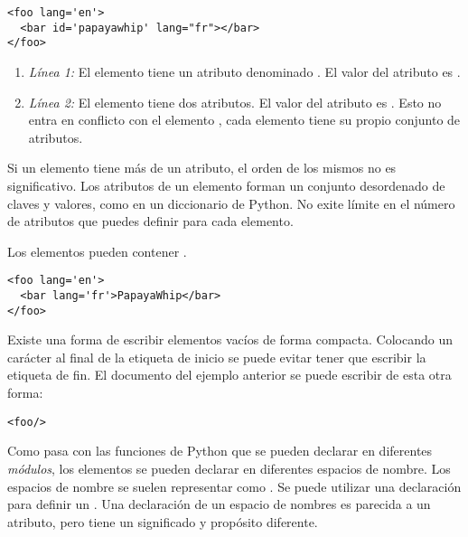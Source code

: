 \noindent\begin{minipage}{\textwidth}
\begin{lstlisting}[mathescape=True]
<foo lang='en'>
  <bar id='papayawhip' lang="fr"></bar>
</foo>
\end{lstlisting}
\end{minipage}

\begin{enumerate}

\item \emph{Línea 1:} El elemento  tiene un atributo denominado . El valor del atributo  es .

\item \emph{Línea 2:} El elemento  tiene dos atributos. El valor del atributo  es . Esto no entra en conflicto con el elemento , cada elemento tiene su propio conjunto de atributos.

\end{enumerate}

Si un elemento tiene más de un atributo, el orden de los mismos no es significativo. Los atributos de un elemento forman un conjunto desordenado de claves y valores, como en un diccionario de Python. No exite límite en el número de atributos que puedes definir para cada elemento.

Los elementos pueden contener .

\noindent\begin{minipage}{\textwidth}
\begin{lstlisting}[mathescape=True]
<foo lang='en'>
  <bar lang='fr'>PapayaWhip</bar>
</foo>
\end{lstlisting}
\end{minipage}

Existe una forma de escribir elementos vacíos de forma compacta. Colocando un carácter \codigo{/} al final de la etiqueta de inicio se puede evitar tener que escribir la etiqueta de fin. El documento  del ejemplo anterior se puede escribir de esta otra forma:

\noindent\begin{minipage}{\textwidth}
\begin{lstlisting}[mathescape=True]
<foo/>
\end{lstlisting}
\end{minipage}

Como pasa con las funciones de Python que se pueden declarar en diferentes \emph{módulos}, los elementos  se pueden declarar en diferentes espacios de nombre. Los espacios de nombre se suelen representar como . Se puede utilizar una declaración  para definir un . Una declaración de un espacio de nombres es parecida a un atributo, pero tiene un significado y propósito diferente.

